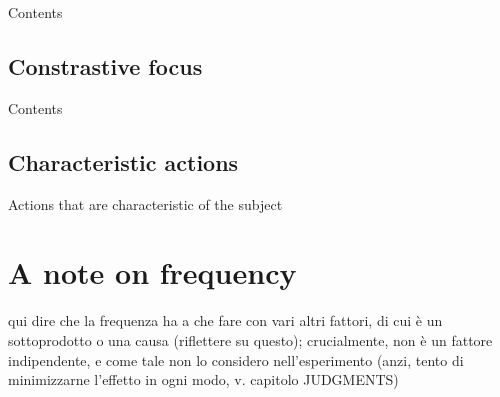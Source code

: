 Contents

\subsection{Constrastive focus} 

Contents

\subsection{Characteristic actions} 

Actions that are characteristic of the subject


\section{A note on frequency}

qui dire che la frequenza ha a che fare con vari altri fattori, di cui è un sottoprodotto o una causa (riflettere su questo); crucialmente, non è un fattore indipendente, e come tale non lo considero nell'esperimento (anzi, tento di minimizzarne l'effetto in ogni modo, v. capitolo JUDGMENTS)





